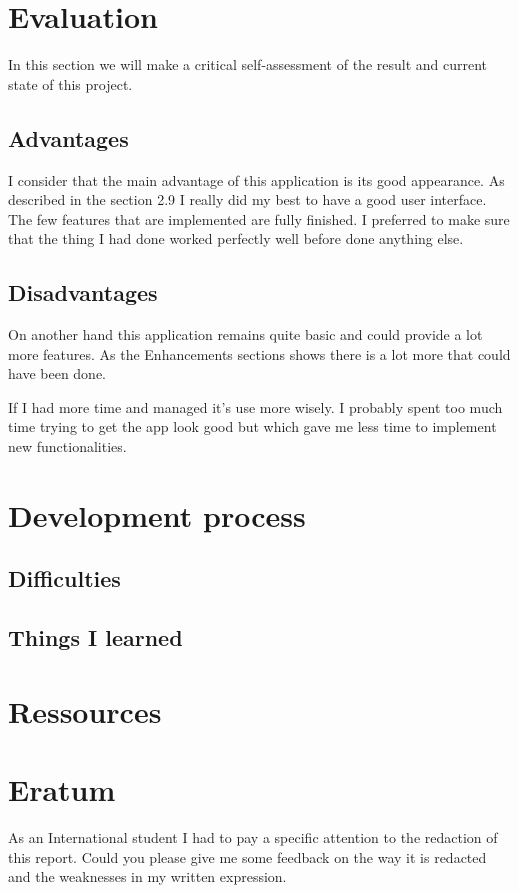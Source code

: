 \documentclass[10pt, a4paper]{article}
\begin{document}
	\section{Evaluation}
	In this section we will make a critical self-assessment of the result and current state of this project. 
	
	\subsection{Advantages} %
	I consider that the main advantage of this application is its good appearance. As described in the section 2.9 I really did my best to have a good user interface. The few features that are implemented are fully finished. I preferred to make sure that the thing I had done worked perfectly well before done anything else.
	
	\subsection{Disadvantages} %
	On another hand this application remains quite basic and could provide a lot more features. As the Enhancements sections shows there is a lot more that could have been done.
	
	If I had more time and managed it's use more wisely. I probably spent too much time trying to get the app look good but which gave me less time to implement new functionalities.
	
	

	\section{Development process} 
	\subsection{Difficulties}  %
	
	\subsection{Things I learned}  %
	
	\section{Ressources}  %
	
	\section{Eratum}
	As an International student I had to pay a specific attention to the redaction of this report. Could you please give me some feedback on the way it is redacted and the weaknesses in my written expression.
		
\end{document}
